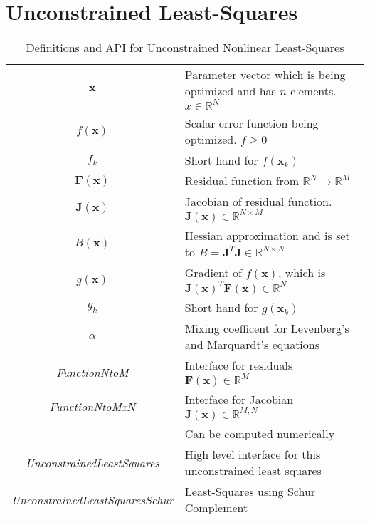 \documentclass[peerreview,compsoc,onecolumn]{IEEEtran}
\newcommand{\R}{\mathbb{R}}
\begin{document}
\section{Unconstrained Least-Squares}
\begin{table*}[h]
\centering
\begin{tabular}{cl}
$\bm{x}$ & Parameter vector which is being optimized and has $n$ elements. $x \in \R^N$ \\
$f(\bm{x})$ & Scalar error function being optimized. $f \ge 0$ \\
$f_k$ & Short hand for $f(\bm{x}_k)$ \\
$\bm{F}(\bm{x})$ & Residual function from $\R^N \rightarrow \R^M$ \\
$\bm{J}(\bm{x})$ & Jacobian of residual function. $\bm{J}(\bm{x}) \in \R^{N \times M}$\\
$B(\bm{x})$ & Hessian approximation and is set to $B=\bm{J}^T\bm{J} \in \R^{N \times N}$ \\
$g(\bm{x})$ & Gradient of $f(\bm{x})$, which is $\bm{J}(\bm{x})^T  \bm{F}(\bm{x}) \in \R^{N}$ \\
$g_k$ & Short hand for $g(\bm{x}_k)$ \\
$\alpha$ & Mixing coefficent for Levenberg's and Marquardt's equations \\
\textit{FunctionNtoM} & Interface for residuals $\bm{F}(\bm{x}) \in \R^M$ \\
\textit{FunctionNtoMxN} & Interface for Jacobian $\bm{J}(\bm{x}) \in \R^{M,N}$ \\
& Can be computed numerically \\
\textit{UnconstrainedLeastSquares} & High level interface for this unconstrained least squares \\
\textit{UnconstrainedLeastSquaresSchur} & Least-Squares using Schur Complement
\end{tabular}
\caption{\label{definitions:UNLS}Definitions and API for Unconstrained Nonlinear Least-Squares}
\end{table*}
\end{document}
